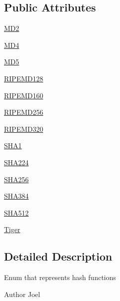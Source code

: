 \subsection*{Public Attributes}
\begin{DoxyCompactItemize}
\item 
\mbox{\hyperlink{enumenums_1_1_hash_function_a632ef791cf6838946717cedd194b190f}{M\+D2}}
\item 
\mbox{\hyperlink{enumenums_1_1_hash_function_a042b8cff0253cf2b8d4622765f69bfea}{M\+D4}}
\item 
\mbox{\hyperlink{enumenums_1_1_hash_function_a1f264a004f5a6701e5cee0fb67fcb088}{M\+D5}}
\item 
\mbox{\hyperlink{enumenums_1_1_hash_function_affe80eafc60defd34fcd7f7797b19e33}{R\+I\+P\+E\+M\+D128}}
\item 
\mbox{\hyperlink{enumenums_1_1_hash_function_aba036610b11d6ad041e015cee3ace6bd}{R\+I\+P\+E\+M\+D160}}
\item 
\mbox{\hyperlink{enumenums_1_1_hash_function_a4e220b2aa70102d8dd5a63e100727392}{R\+I\+P\+E\+M\+D256}}
\item 
\mbox{\hyperlink{enumenums_1_1_hash_function_a2ed7b6d5a3c4936d9b07c4abed731167}{R\+I\+P\+E\+M\+D320}}
\item 
\mbox{\hyperlink{enumenums_1_1_hash_function_a3d14cd23825e452f34a4515a7b55a763}{S\+H\+A1}}
\item 
\mbox{\hyperlink{enumenums_1_1_hash_function_a2c0b1237f30b7404a5eeadcc84c128fa}{S\+H\+A224}}
\item 
\mbox{\hyperlink{enumenums_1_1_hash_function_a6e9ee0b4bc753989f4a53cc640ce4e65}{S\+H\+A256}}
\item 
\mbox{\hyperlink{enumenums_1_1_hash_function_ae38aa31f677ed5a533ae5119412037b9}{S\+H\+A384}}
\item 
\mbox{\hyperlink{enumenums_1_1_hash_function_af54119cc669ff7a2aaf5b56440ab9877}{S\+H\+A512}}
\item 
\mbox{\hyperlink{enumenums_1_1_hash_function_a666494ba6fab98cb9e49be4b1d979e94}{Tiger}}
\end{DoxyCompactItemize}


\subsection{Detailed Description}
Enum that represents hash functions \begin{DoxyAuthor}{Author}
Joel 
\end{DoxyAuthor}


